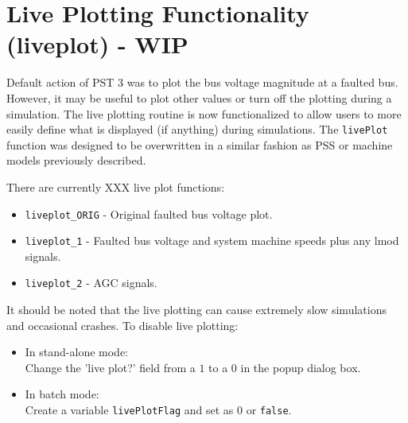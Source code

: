 \section{Live Plotting Functionality (liveplot) - WIP} 
Default action of PST 3 was to plot the bus voltage magnitude at a faulted bus.
However, it may be useful to plot other values or turn off the plotting during a simulation.
The live plotting routine is now functionalized to allow users to more easily define what is displayed (if anything) during simulations.
The \verb|livePlot| function was designed to be overwritten in a similar fashion as PSS or machine models previously described.

There are currently XXX live plot functions:

\begin{itemize}
\item \verb|liveplot_ORIG| - Original faulted bus voltage plot.
\item \verb|liveplot_1| - Faulted bus voltage and system machine speeds plus any lmod signals.
\item \verb|liveplot_2| - AGC signals.
\end{itemize}

It should be noted that the live plotting can cause extremely slow simulations and occasional crashes.
To disable live plotting:
\begin{itemize}
\item In stand-alone mode: \\Change the 'live plot?' field from a $1$ to a $0$ in the popup dialog box.
\item In batch mode:  \\Create a variable \verb|livePlotFlag| and set as $0$ or \verb|false|.
\end{itemize}